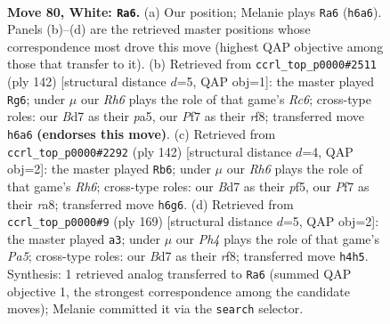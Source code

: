 \documentclass[11pt]{article}
\begin{document}
\clearpage

\begin{figure}[p]\centering
\begin{subfigure}{0.46\textwidth}\centering
\resizebox{\linewidth}{!}{%
\newchessgame
\chessboard[
  setfen={8/3B1P2/7R/8/1k5P/8/5K2/8 w - - 3 80},
  showmover=false,
  pgfstyle=straightmove, color=movearrow, markmove={h6-a6}
]}
\caption{}
\end{subfigure}\hfill
\begin{subfigure}{0.46\textwidth}\centering
\resizebox{\linewidth}{!}{%
\newchessgame
\chessboard[
  setfen={5r2/k7/2R5/p7/8/8/K1P5/8 w - - 16 72},
  showmover=false,
  pgfstyle=straightmove, color=movearrow, markmove={c6-g6}
]}
\caption{}
\end{subfigure}
\\[4pt]
\begin{subfigure}{0.46\textwidth}\centering
\resizebox{\linewidth}{!}{%
\newchessgame
\chessboard[
  setfen={r7/8/7R/5p2/7P/2K2k2/8/8 w - - 5 72},
  showmover=false,
  pgfstyle=straightmove, color=movearrow, markmove={h6-b6}
]}
\caption{}
\end{subfigure}\hfill
\begin{subfigure}{0.46\textwidth}\centering
\resizebox{\linewidth}{!}{%
\newchessgame
\chessboard[
  setfen={5R2/1k6/8/8/p7/7P/r7/6K1 b - - 5 85},
  showmover=false,
  pgfstyle=straightmove, color=movearrow, markmove={a4-a3}
]}
\caption{}
\end{subfigure}
\caption{\textbf{Move 80, White: \texttt{Ra6}.} (a) Our position; Melanie plays \texttt{Ra6} (\texttt{h6a6}). Panels (b)--(d) are the retrieved master positions whose correspondence most drove this move (highest QAP objective among those that transfer to it). (b) Retrieved from \texttt{ccrl\_top\_p0000\#2511} (ply 142) [structural distance $d$=5, QAP obj=1]: the master played \texttt{Rg6}; under $\mu$ our \emph{Rh6} plays the role of that game's \emph{Rc6}; cross-type roles: our \emph{B}d7 as their \emph{p}a5, our \emph{P}f7 as their \emph{r}f8; transferred move \texttt{h6a6} \textbf{(endorses this move)}. (c) Retrieved from \texttt{ccrl\_top\_p0000\#2292} (ply 142) [structural distance $d$=4, QAP obj=2]: the master played \texttt{Rb6}; under $\mu$ our \emph{Rh6} plays the role of that game's \emph{Rh6}; cross-type roles: our \emph{B}d7 as their \emph{p}f5, our \emph{P}f7 as their \emph{r}a8; transferred move \texttt{h6g6}. (d) Retrieved from \texttt{ccrl\_top\_p0000\#9} (ply 169) [structural distance $d$=5, QAP obj=2]: the master played \texttt{a3}; under $\mu$ our \emph{Ph4} plays the role of that game's \emph{Pa5}; cross-type roles: our \emph{B}d7 as their \emph{r}f8; transferred move \texttt{h4h5}. Synthesis: 1 retrieved analog transferred to \texttt{Ra6} (summed QAP objective 1, the strongest correspondence among the candidate moves); Melanie committed it via the \texttt{search} selector.}
\label{fig:thought-m158}
\end{figure}
\end{document}
